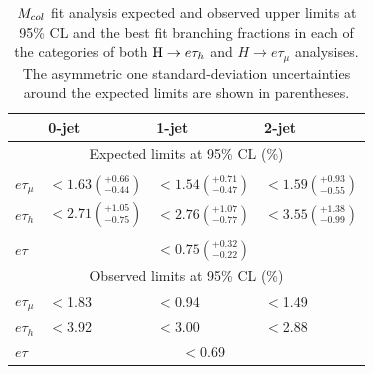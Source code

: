 \begin{table}[hbtp]
 \centering
  \caption{$M_{col}$ fit analysis expected and observed upper limits at 95\% CL and the best fit branching fractions in each of the categories of both $\mathrm{H} \to e \tau_{h}$ and $H \to e \tau_{\mu}$ analysises. The asymmetric one standard-deviation uncertainties around the expected limits are shown in parentheses.}
  \label{tab:expected_limits}
  {
  \begin{tabular}{l|l|l|l} \hline
                     &  0-jet  & 1-jet  &  2-jet  \\ \hline
\multicolumn{4}{c}{Expected limits at 95\% CL  (\%)}\\  \hline \\[-2.2ex]
        $e\tau_{\mu}$  &  ${<}1.63\left({}_{-0.44}^{+0.66}\right)$ &  ${<}1.54\left({}_{-0.47}^{+0.71}\right)$ &  ${<}1.59\left({}_{-0.55}^{+0.93}\right)$  \\[0.4ex]
        $e\tau_{h}$  &  ${<}2.71\left({}_{-0.75}^{+1.05}\right)$ & ${<}2.76\left({}_{-0.77}^{+1.07}\right)$ &  ${<}3.55\left({}_{-0.99}^{+1.38}\right)$ \\[0.4ex] \hline\\[-2.2ex]
            $e\tau$  & \multicolumn{3}{c}{  ${<}0.75\left({}_{-0.22}^{+0.32}\right)$  } \\[0.4ex] \hline
\multicolumn{4}{c}{Observed limits at 95\% CL (\%)} \\ \hline
       $e\tau_{\mu}$  &  $<$1.83  &  $<$0.94 &  $<$1.49   \\
      $e\tau_{h}$  & $<$3.92 & $<$3.00 & $<$2.88 \\ \hline
             $e\tau$  & \multicolumn{3}{c}{  $<$0.69 }   \\ \hline
  \end{tabular}
}
\end{table}



